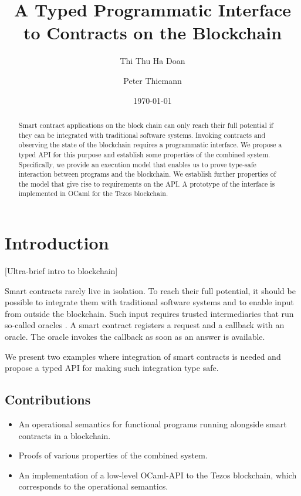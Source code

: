 \documentclass[a4paper]{llncs}
\title{A Typed Programmatic Interface to Contracts on the Blockchain}
\author{Thi Thu Ha Doan\and
Peter Thiemann\orcidID{0000-0002-9000-1239}}
\institute{University of Freiburg, Germany\\
\email{\{doanha,thiemann\}@informatik.uni-freiburg.de}
}
\date{\today}
\begin{document}
\maketitle
\pagestyle{plain}
\begin{abstract}
  Smart contract applications on the block chain can only reach their full potential if
  they can be integrated with traditional software systems. Invoking
  contracts and observing the state of the blockchain requires a
  programmatic interface. We propose a typed API for this
  purpose and establish some properties of the combined
  system. Specifically, we provide an execution model that
  enables us to prove type-safe interaction between programs and the 
  blockchain. We establish further properties of the model that
  give rise to requirements on the API. A prototype of the interface
  is implemented in OCaml for the Tezos blockchain.
\end{abstract}

\section{Introduction}
\label{sec:introduction}

{[Ultra-brief intro to blockchain]}

Smart contracts rarely live in isolation. To reach their full
potential, it should be possible to integrate them with traditional
software systems and to enable input from outside the blockchain. Such
input requires trusted intermediaries that run so-called oracles \cite{oracles}. A
smart contract registers a request and a callback with an oracle. The
oracle invokes the callback as soon as an answer is available. 

We present two examples where integration of smart contracts is needed
and propose a typed API for making such integration type safe.

\subsection{Contributions}
\label{sec:contributions}

\begin{itemize}
\item An operational semantics for functional programs running
  alongside smart contracts in a blockchain. 
\item Proofs of various properties of the combined system.
\item An implementation of a low-level OCaml-API to the Tezos
  blockchain, which corresponds to the operational semantics.
\end{itemize}
\end{document}
